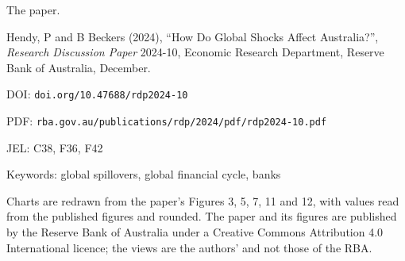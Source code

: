 \documentclass[aspectratio=169,11pt]{beamer}
\def\decksource{}
\newcommand{\src}[1]{\def\decksource{#1}}
\newcommand{\kicker}[1]{%
  {\fontsize{7.6}{9}\selectfont\color{teal}\bfseries\textls[130]{\MakeUppercase{#1}}}\par
  \vspace{0.16cm}}
\newcommand{\headline}[1]{%
  {\rmfamily\fontsize{18.4}{21.8}\selectfont\color{ink}#1\par}
  \vspace{0.34cm}}
\newcommand{\bodyfont}{\fontsize{9.7}{12.9}\selectfont}
\newcommand{\smallfont}{\fontsize{8.2}{11.2}\selectfont}
\newcommand{\notefont}{\fontsize{7.1}{9.4}\selectfont}
\begin{document}
\begin{frame}[t]
\src{}
\vspace*{0.42cm}
\kicker{Source}
\headline{The paper.}
\bodyfont

\begin{minipage}[t]{8.7cm}
\raggedright
{\fontsize{9.9}{12.8}\selectfont
Hendy, P and B Beckers (2024), ``How Do Global Shocks Affect Australia?'', \emph{Research Discussion
Paper} 2024-10, Economic Research Department, Reserve Bank of Australia, December.\par}

\vspace{0.40cm}
{\notefont\color{muted}
DOI: \texttt{doi.org/10.47688/rdp2024-10}\par
\vspace{0.08cm}
PDF: \texttt{rba.gov.au/publications/rdp/2024/pdf/rdp2024-10.pdf}\par
\vspace{0.08cm}
JEL: C38, F36, F42\par
\vspace{0.08cm}
Keywords: global spillovers, global financial cycle, banks\par}

\vspace{0.90cm}
{\notefont\color{muted}
Charts are redrawn from the paper's Figures 3, 5, 7, 11 and 12, with values read from the published
figures and rounded. The paper and its figures are published by the Reserve Bank of Australia under a
Creative Commons Attribution 4.0 International licence; the views are the authors' and not those of
the RBA.\par}
\end{minipage}\hfill
\begin{minipage}[t]{4.9cm}
\end{minipage}
\end{frame}
\end{document}
